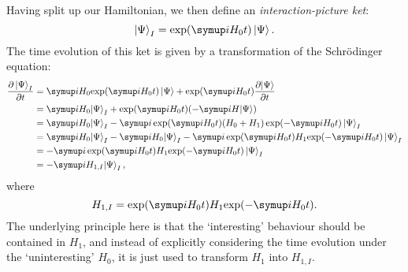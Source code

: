 Having split up our Hamiltonian, we then define an \textit{interaction-picture ket}:
\begin{equation}
    \label{eq:interaction_state}
    \ket{\Psi}_I = \exp(\mi H_0 t)\ket{\Psi}.
\end{equation}
The time evolution of this ket is given by a transformation of the Schr\"odinger equation:
\begin{align}
    \label{eq:interaction_evolution}
    \frac{\partial\ket{\Psi}_I}{\partial t} &= \mi H_0\!\exp(\mi H_0 t) \ket{\Psi} + \exp(\mi H_0 t)\frac{\partial\!\ket{\Psi}}{\partial t} \notag \\
                                            &= \mi H_0 \!\ket{\Psi}_I + \exp(\mi H_0 t) (-\mi H\!\ket{\Psi}) \notag \\
                                            &= \mi H_0 \!\ket{\Psi}_I - \mi\exp(\mi H_0t)(H_0 + H_1)\exp(-\mi H_0 t)\ket{\Psi}_I \notag \\
                                            &= \mi H_0 \!\ket{\Psi}_I - \mi H_0\!\ket{\Psi}_I - \mi\exp(\mi H_0t)H_1\!\exp(-\mi H_0 t)\ket{\Psi}_I \notag \\
                                            &= -\mi\exp(\mi H_0 t)H_1\!\exp(-\mi H_0 t)\ket{\Psi}_I \notag \\
                                            &= -\mi H_{1,I} \!\ket{\Psi}_I,
\end{align}
where
\begin{equation}
    \label{eq:interaction_h1i}
    H_{1,I} = \exp(\mi H_0 t) H_1 \!\exp(-\mi H_0 t).
\end{equation}
The underlying principle here is that the `interesting' behaviour should be contained in $H_1$, and instead of explicitly considering the time evolution under the `uninteresting' $H_0$, it is just used to transform $H_1$ into $H_{1,I}$.

